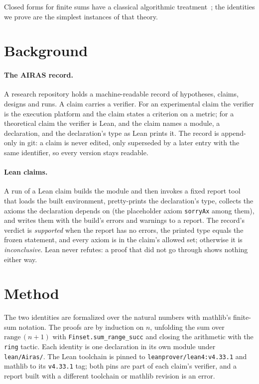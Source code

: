 \documentclass[journal,article,submit,pdftex,moreauthors]{Definitions/mdpi}
\begin{document}
Closed forms for finite sums have a classical algorithmic treatment~\cite{karr-1981-summation}; the identities we prove are the simplest instances of that theory.

\section{Background}

\paragraph{The AIRAS record.} A research repository holds a machine-readable record of hypotheses, claims, designs and runs. A claim carries a verifier. For an experimental claim the verifier is the execution platform and the claim states a criterion on a metric; for a theoretical claim the verifier is Lean, and the claim names a module, a declaration, and the declaration's type as Lean prints it. The record is append-only in git: a claim is never edited, only superseded by a later entry with the same identifier, so every version stays readable.

\paragraph{Lean claims.} A run of a Lean claim builds the module and then invokes a fixed report tool that loads the built environment, pretty-prints the declaration's type, collects the axioms the declaration depends on (the placeholder axiom \texttt{sorryAx} among them), and writes them with the build's errors and warnings to a report. The record's verdict is \emph{supported} when the report has no errors, the printed type equals the frozen statement, and every axiom is in the claim's allowed set; otherwise it is \emph{inconclusive}. Lean never refutes: a proof that did not go through shows nothing either way.

\section{Method}

The two identities are formalized over the natural numbers with mathlib's finite-sum notation. The proofs are by induction on $n$, unfolding the sum over $\mathrm{range}\,(n+1)$ with \texttt{Finset.sum\_range\_succ} and closing the arithmetic with the \texttt{ring} tactic. Each identity is one declaration in its own module under \texttt{lean/Airas/}. The Lean toolchain is pinned to \texttt{leanprover/lean4:v4.33.1} and mathlib to its \texttt{v4.33.1} tag; both pins are part of each claim's verifier, and a report built with a different toolchain or mathlib revision is an error.
\end{document}
